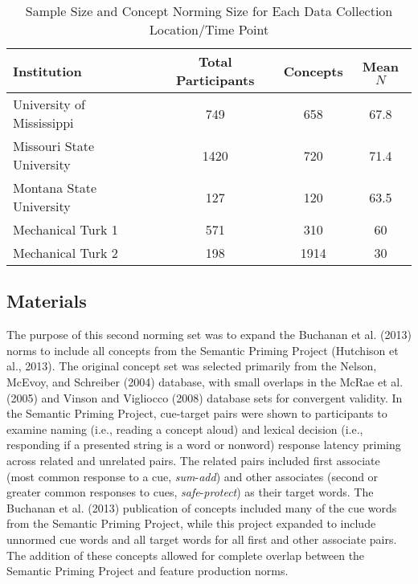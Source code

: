 \documentclass[english,,man]{apa6}
\theoremstyle{definition}
\theoremstyle{definition}
\theoremstyle{definition}
\theoremstyle{remark}
\begin{document}
\begin{table}[tbp]
\begin{center}
\begin{threeparttable}
\caption{\label{tab:part-table}Sample Size and Concept Norming Size for Each Data Collection Location/Time Point}
\begin{tabular}{lccc}
\toprule
Institution & Total Participants & Concepts & Mean $N$\\
\midrule
University of Mississippi & 749 & 658 & 67.8\\
Missouri State University & 1420 & 720 & 71.4\\
Montana State University & 127 & 120 & 63.5\\
Mechanical Turk 1 & 571 & 310 & 60\\
Mechanical Turk 2 & 198 & 1914 & 30\\
\bottomrule
\end{tabular}
\end{threeparttable}
\end{center}
\end{table}

\hypertarget{materials}{%
\subsection{Materials}\label{materials}}

The purpose of this second norming set was to expand the Buchanan et al.
(2013) norms to include all concepts from the Semantic Priming Project
(Hutchison et al., 2013). The original concept set was selected
primarily from the Nelson, McEvoy, and Schreiber (2004) database, with
small overlaps in the McRae et al. (2005) and Vinson and Vigliocco
(2008) database sets for convergent validity. In the Semantic Priming
Project, cue-target pairs were shown to participants to examine naming
(i.e., reading a concept aloud) and lexical decision (i.e., responding
if a presented string is a word or nonword) response latency priming
across related and unrelated pairs. The related pairs included first
associate (most common response to a cue, \emph{sum}-\emph{add}) and
other associates (second or greater common responses to cues,
\emph{safe}-\emph{protect}) as their target words. The Buchanan et al.
(2013) publication of concepts included many of the cue words from the
Semantic Priming Project, while this project expanded to include
unnormed cue words and all target words for all first and other
associate pairs. The addition of these concepts allowed for complete
overlap between the Semantic Priming Project and feature production
norms.
\end{document}
